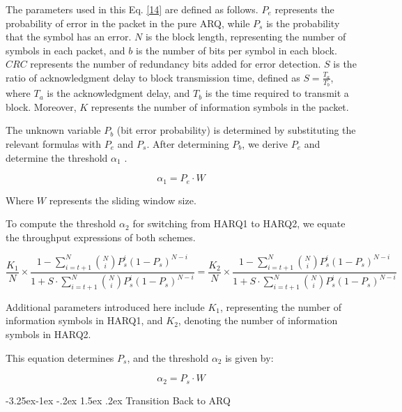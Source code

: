 \documentclass[sn-mathphys-num]{sn-jnl}
\makeatletter
\theoremstyle{thmstyleone}
\theoremstyle{thmstyletwo}%
\theoremstyle{thmstylethree}%
\renewcommand\subsubsection{%
  \@startsection{subsubsection}{3}{\z@}%
  {-3.25ex\@plus -1ex \@minus -.2ex}%
  {1.5ex \@plus .2ex}%
  {\normalfont\normalsize}}
\makeatother
\begin{document}
The parameters used in this Eq. \ref{14} are defined as follows. $P_e$ represents the probability of error in the packet in the pure ARQ, while ${P}_s$ is the probability that the symbol has an error. $N$ is the block length, representing the number of symbols in each packet, and $b$ is the number of bits per symbol in each block. $CRC$ represents the number of redundancy bits added for error detection. $S$ is the ratio of acknowledgment delay to block transmission time, defined as $S = \frac{T_a}{T_b}$, where $T_a$ is the acknowledgment delay, and $T_b$ is the time required to transmit a block. Moreover, $K$ represents the number of information symbols in the packet.

The unknown variable \(P_b \) (bit error probability) is determined by substituting the relevant formulas with \(P_e \) and \(P_s \). After determining \(P_b \), we derive \(P_e \) and determine the threshold \(\alpha_1 \) \cite{r8}.

\begin{equation}
    \alpha_1 = P_e \cdot W
\end{equation}

Where $W$ represents the sliding window size.

To compute the threshold $\alpha_2$ for switching from HARQ1 to HARQ2, we equate the throughput expressions of both schemes.

\begin{equation}
\frac{K_1}{N} \times \frac{1 - \sum_{i=t+1}^{N} \binom{N}{i} P_s^i (1-P_s)^{N-i}}{1 + S \cdot \sum_{i=t+1}^{N} \binom{N}{i} P_s^i (1-P_s)^{N-i}} = \frac{K_2}{N} \times \frac{1 - \sum_{i=t+1}^{N} \binom{N}{i} P_s^i (1-P_s)^{N-i}}{1 + S \cdot \sum_{i=t+1}^{N} \binom{N}{i} P_s^i (1-P_s)^{N-i}} \label{eq:combined2}
\end{equation}

Additional parameters introduced here include $K_1$, representing the number of information symbols in HARQ1, and $K_2$, denoting the number of information symbols in HARQ2.

This equation determines $P_s$, and the threshold $\alpha_2$ \cite{r8} is given by:

\begin{equation}
\alpha_2 = P_s \cdot W
\end{equation}

\subsubsection{Transition Back to ARQ}
\end{document}
